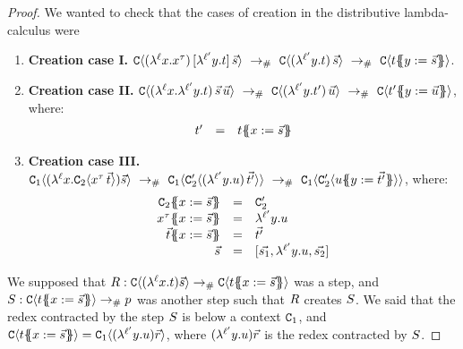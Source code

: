 
\begin{proof}
We wanted to check that the cases of creation in the distributive lambda-calculus were
\begin{enumerate}
\item {\bf Creation case I.}
  $
    \con\of{ (\lamp{\lab}{\var}{\var^{\typ}})\,[\lamp{\labtwo}{\vartwo}{\tm}]\, \ls{\tmtwo}}
    \ \todist\ %
    \con\of{ (\lamp{\labtwo}{\vartwo}{\tm})\,\ls{\tmtwo} }
    \ \todist\ %
    \con\of{ \tm\sub{\vartwo}{\ls{\tmtwo}} }
  $.
\item {\bf Creation case II.}
  $
     \con\of{ (\lamp{\lab}{\var}{ \lamp{\labtwo}{\vartwo}{\tm} })\,\ls{\tmtwo}\,\ls{\tmthree} }
     \ \todist\ %
     \con\of{ (\lamp{\labtwo}{\vartwo}{\tm'})\,\ls{\tmthree} }
     \ \todist\ %
     \con\of{ \tm'\sub{\vartwo}{\ls{\tmthree}} }
  $, where:
  \[
     \begin{array}{rcl}
     t' & = & t\{\!\!\{x := \vec{s}\}\!\!\}
     \end{array}
  \]
\item {\bf Creation case III.}
  $
    \con_1\of{(\lamp{\lab}{\var}{\con_2\of{\var^{\typ}\,\ls{\tm}}})\ls{\tmtwo}}
    \ \todist\ %
    \con_1\of{\con'_2\of{(\lamp{\labtwo}{\vartwo}{\tmthree})\,\ls{\tm'}}}
    \ \todist\ %
    \con_1\of{\con'_2\of{\tmthree\sub{\vartwo}{\ls{\tm'}}}}
  $,
  where:
  \[
  \begin{array}{rcl}
    \con_2\sub{\var}{\ls{\tmtwo}}      & = & \con'_2 \\
    \var^{\typ}\sub{\var}{\ls{\tmtwo}} & = & \lamp{\labtwo}{\vartwo}{\tmthree} \\
    \ls{\tm}\sub{\var}{\ls{\tmtwo}}    & = & \ls{\tm'} \\
    \ls{\tmtwo}                        & = & [\ls{\tmtwo_1},\lamp{\labtwo}{\vartwo}{\tmthree},\ls{\tmtwo_2}] \\
  \end{array}
  \]
\end{enumerate}

We supposed that $R : \mathtt{C}\langle(\lambda^{\ell} x. t)\vec{s}\rangle \mathrel{\to_{\mathtt{\#}}} \mathtt{C}\langle t\{\!\!\{x := \vec{s}\}\!\!\}\rangle$ was a step,
and $S : \mathtt{C}\langle t\{\!\!\{x := \vec{s}\}\!\!\}\rangle \mathrel{\to_{\mathtt{\#}}} p$ was another step
such that $R$ creates $S$.
We said that the redex contracted by the step $S$ is below a context $\mathtt{C}_1$,
and $\mathtt{C}\langle t\{\!\!\{x := \vec{s}\}\!\!\}\rangle = \mathtt{C}_1\langle(\lambda^{\ell'} y. u)\vec{r}\rangle$,
where $(\lambda^{\ell'} y. u)\vec{r}$ is the redex contracted by $S$.



\end{proof}
